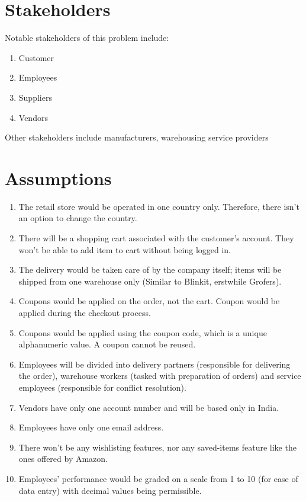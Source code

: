 \documentclass[12pt]{report}
\begin{document}
    \section{Stakeholders}
    Notable stakeholders of this problem include:
    \begin{enumerate}
        \item Customer
        \item Employees
        \item Suppliers
        \item Vendors
    \end{enumerate}
    Other stakeholders include manufacturers, warehousing service providers
    
    \section{Assumptions}
    \begin{enumerate}
        \item The retail store would be operated in one country only. Therefore, there isn't an option to change the country.
        \item There will be a shopping cart associated with the customer's account. They won't be able to add item to cart without being logged in.
        \item The delivery would be taken care of by the company itself; items will be shipped from one warehouse only (Similar to Blinkit, erstwhile Grofers).
        \item Coupons would be applied on the order, not the cart. Coupon would be applied during the checkout process.
        \item Coupons would be applied using the coupon code, which is a unique alphanumeric value. A coupon cannot be reused.
        \item Employees will be divided into delivery partners (responsible for delivering the order), warehouse workers (tasked with preparation of orders) and service employees (responsible for conflict resolution).
        \item Vendors have only one account number and will be based only in India.
        \item Employees have only one email address.
        \item There won't be any wishlisting features, nor any saved-items feature like the ones offered by Amazon.
        \item Employees' performance would be graded on a scale from 1 to 10 (for ease of data entry) with decimal values being permissible.
    \end{enumerate}
\end{document}

